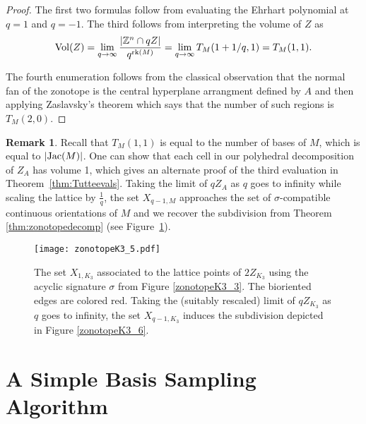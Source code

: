 \documentclass[12pt]{amsart}
\numberwithin{equation}{section}
\theoremstyle{definition}
\newtheorem{remark}[theorem]{Remark}
\begin{document}
\begin{proof}
The first two formulas follow from evaluating the Ehrhart polynomial at $q=1$ and $q=-1$.  The third follows from interpreting the volume of $Z$ as $${\rm Vol}(Z) = \lim_{q \rightarrow \infty} \frac{|\mathbb{Z}^n \cap qZ|}{q^{{\rm rk}(
M)}} = \lim_{q \rightarrow \infty} T_{M}(1+1/q,1) = T_{M}(1,1).$$

The fourth enumeration follows from the classical observation that the normal fan of the zonotope is the central hyperplane arrangment defined by $A$ and then applying Zaslavsky's theorem which says that the number of such regions is $T_{M}(2,0)$.
\end{proof}

\begin{remark}
Recall that $T_M(1,1)$ is equal to the number of bases of $M$, which is equal to $|{\rm Jac}(M)|$. One can show that each cell in our polyhedral decomposition of $Z_A$ has volume 1, which gives an alternate proof of the third evaluation in Theorem~\ref{thm:Tutteevals}.   
Taking the limit of $qZ_{A}$ as $q$ goes to infinity while scaling the lattice by $\frac{1}{q}$, the set $X_{q-1,M}$ approaches the set of $\sigma$-compatible continuous orientations of $M$ and we recover the subdivision from Theorem \ref{thm:zonotopedecomp} (see Figure~\ref{fig:Fig5}).
\end{remark}

\begin{figure}[ht!] \label{fig:Fig5}
\begin{center}
    \texttt{[image: zonotopeK3\_5.pdf]}
\end{center}
  \caption{The set $X_{1,K_3}$ associated to the lattice points of $2Z_{K_3}$ using the acyclic signature $\sigma$ from Figure \ref{zonotopeK3_3}.  The bioriented edges are colored red. Taking the (suitably rescaled) limit of $qZ_{K_3}$ as $q$ goes to infinity,  the set $X_{q-1,K_3}$  induces the subdivision depicted in Figure \ref{zonotopeK3_6}.}
\end{figure}


\appendix
\section{A Simple Basis Sampling Algorithm}
\end{document}
